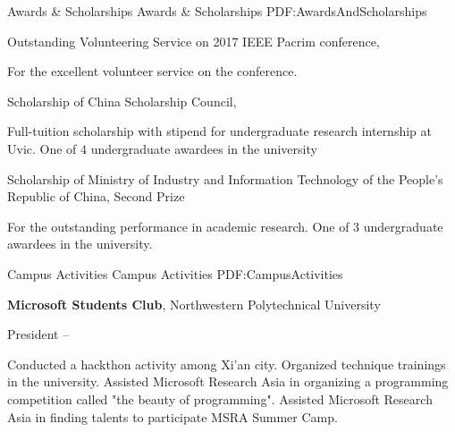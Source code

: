 \documentclass[letterpaper,MMMyyyy,nonstopmode]{simpleresumecv}
\begin{document}
\begin{Body}
\Section
{Awards \&\newline
Scholarships}
{Awards \& Scholarships}
{PDF:AwardsAndScholarships}

\BulletItem
Outstanding Volunteering Service on 2017 IEEE Pacrim conference,
\hfill
{}
\begin{Detail}
\Item
For the excellent volunteer service on the conference.
\end{Detail}
\Gap
\BulletItem
Scholarship of China Scholarship Council,
\hfill
{}
\begin{Detail}
\Item
Full-tuition scholarship with stipend for undergraduate research internship at Uvic. One of $4$ undergraduate awardees in the university
\end{Detail}
\Gap
\BulletItem
Scholarship of Ministry of Industry and Information Technology of the People’s Republic of China,
Second Prize
\hfill
{}
\begin{Detail}
\Item
For the outstanding performance in academic research. One of $3$ undergraduate awardees in the university.
\end{Detail}










\Section
{Campus Activities}
{Campus Activities}
{PDF:CampusActivities}

\Entry
\textbf{Microsoft Students Club},
Northwestern Polytechnical University

\Gap
\BulletItem
President
\hfill
{} --
\begin{Detail}
\SubBulletItem
Conducted a hackthon activity among Xi'an city.
\SubBulletItem
Organized technique trainings in the university.
\SubBulletItem
Assisted Microsoft Research Asia in organizing a programming competition called "the beauty of programming".
\SubBulletItem
Assisted Microsoft Research Asia in finding talents to participate MSRA Summer Camp.
\end{Detail}


\end{Body}
\end{document}
